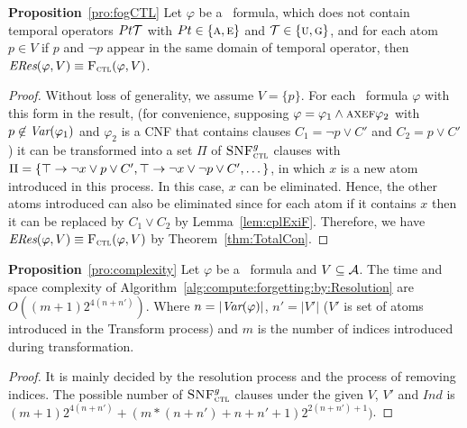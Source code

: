 \documentclass[twoside,11pt]{article}
\begin{document}
	
	\noindent\textbf{Proposition}~\ref{pro:fogCTL}
	Let $\varphi$ be a \CTL\ formula, which does not contain temporal operators $Pt {\cal T}$ with $Pt \in \{\textsc{a}, \textsc{e}\}$ and ${\cal T} \in \{\textsc{u}, \textsc{g}\}$, and for each atom $p\in V$ if $p$ and $\neg p$ appear in the same domain of temporal operator, then $\emph{ERes}(\varphi,V) \equiv {\textsc{F}_{\textsc{ctl}}}(\varphi, V)$.
	\\
	\begin{proof}
		Without loss of generality, we assume  $V = \{p\}$.
		For each \CTL\ formula $\varphi$ with this form in the result, (for convenience, supposing  $\varphi = \varphi_1 \wedge \textsc{a} \textsc{x} \textsc{e} \textsc{f} \varphi_2$ with $p\not \in \textit{Var}(\varphi_1)$ and $\varphi_2$ is a CNF that contains clauses $C_1 = \neg p \vee C'$ and $C_2 = p \vee  C'$) it can be transformed into a set $\Pi$ of ${\textsc{SNF}_{\textsc{ctl}}^g}$ clauses with $\Pi = \{\top \rightarrow \neg x \vee p \vee  C',  \top \rightarrow \neg x \vee \neg p \vee C',\dots\}$, in which $x$ is a new atom introduced in this process. In this case, $x$ can be eliminated. Hence, the other atoms introduced can also be eliminated since for each atom if it contains $x$ then it can be  replaced by $C_1 \vee C_2$  by Lemma~\ref{lem:cplExiF}.  Therefore, we have $\emph{ERes}(\varphi,V) \equiv {\textsc{F}_{\textsc{ctl}}}(\varphi, V)$ by Theorem~\ref{thm:TotalCon}.
	\end{proof}
	
	
	\noindent\textbf{Proposition}~\ref{pro:complexity}
	Let $\varphi$ be a \CTL\ formula and $V \subseteq {\cal A}$.
	The time and space complexity of Algorithm~\ref{alg:compute:forgetting:by:Resolution} are $O((m+1)2^{4(n+n')})$. Where $n=|\textit{Var}(\varphi)|$, $n'=|V'|$ ($V'$ is set of atoms introduced in the Transform process) and $m$ is the number of indices introduced during transformation.
	\\
	\begin{proof}
		It is mainly decided by the resolution process and the process of removing indices.
		The possible number of ${\textsc{SNF}_{\textsc{ctl}}^g}$ clauses under the given $V$, $V'$ and $Ind$ is $(m+1)2^{4(n+n')}+(m*(n+n')+n+n'+1)2^{2(n+n')+1})$.
	\end{proof}
	
	
	
\end{document}
